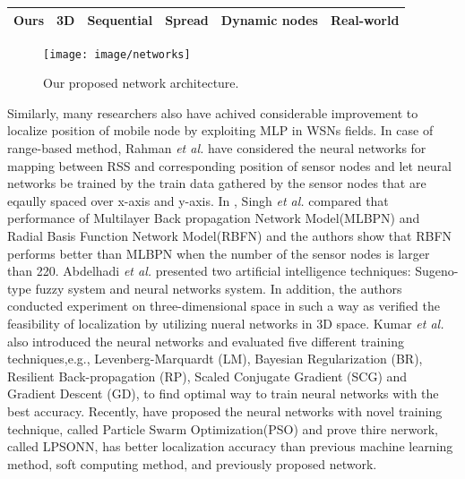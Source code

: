 \documentclass[letterpaper, 10 pt, conference]{ieeeconf}  %
\begin{document}
\begin{table}[ht]
\begin{tabular}{l|l|l|l|l|l}
		Ours&
		\multicolumn{1}{c}{3D \checkmark}                   &      
		\multicolumn{1}{c}{Sequential \checkmark}                 &   \multicolumn{1}{c}{Spread \checkmark}                   & 
		\multicolumn{1}{c}{Dynamic nodes \checkmark}        &   \multicolumn{1}{c}{Real-world \checkmark}   \\ 
		\bottomrule
	\end{tabular}
	\label{table:related_worsk}
	
\end{table}

\begin{figure}[h]
	\centering
	\texttt{[image: image/networks]}
	\caption{Our proposed network architecture.}
	\label{fig:our_network}
\end{figure}

Similarly, many researchers also have achived considerable improvement to localize position of mobile node by exploiting MLP in WSNs fields\cite{shareef2008localization, rahman2009localization, singh2013tdoa,abdelhadi2013efficient,bernas2015fully, kumar2016localization, banihashemian2018new}. In case of range-based method, Rahman \textit{et al.} \cite{rahman2009localization} have considered the neural networks for mapping between RSS and corresponding position of sensor nodes and let neural networks be trained by the train data gathered by the sensor nodes that are eqaully spaced over x-axis and y-axis. In \cite{singh2013tdoa}, Singh \textit{et al.} compared that performance of Multilayer Back propagation Network Model(MLBPN) and Radial Basis Function Network Model(RBFN) and the authors show that RBFN performs better than MLBPN when the number of the sensor nodes is larger than 220. Abdelhadi \textit{et al.}  \cite{abdelhadi2013efficient} presented two artificial intelligence techniques: Sugeno-type fuzzy system and neural networks system. In addition, the authors conducted experiment on three-dimensional space in such a way as verified the feasibility of localization by utilizing nueral networks in 3D space. Kumar \textit{et al.} \cite{kumar2016localization} also introduced the neural networks and evaluated five different training techniques,e.g., Levenberg-Marquardt (LM), Bayesian Regularization
(BR), Resilient Back-propagation (RP), Scaled Conjugate Gradient (SCG) and Gradient
Descent (GD), to find optimal way to train neural networks with the best accuracy. Recently, \cite{banihashemian2018new} have proposed the neural networks with novel training technique, called Particle Swarm Optimization(PSO) and prove thire nerwork, called LPSONN, has better localization accuracy than previous machine learning method, soft computing method, and previously proposed network.
\end{document}
